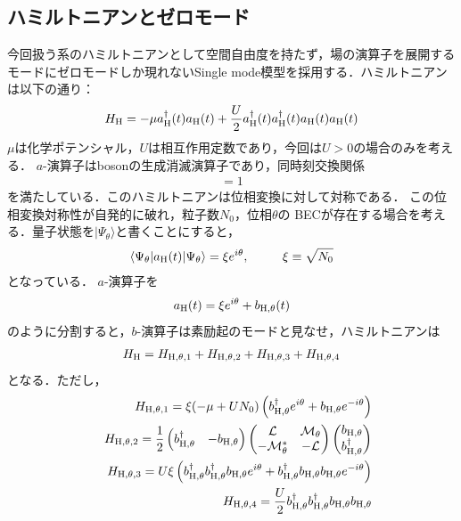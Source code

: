 \documentclass[10.5pt,a4paper]{jreport}
\begin{document}
\subsection{ハミルトニアンとゼロモード}
今回扱う系のハミルトニアンとして空間自由度を持たず，場の演算子を展開するモードにゼロモードしか現れないSingle mode模型を採用する．ハミルトニアンは以下の通り：
\begin{eqnarray}
  H_{\rm{H}} = -\mu a^{\dagger}_{\rm{H}}(t) a_{\rm{H}}(t) +\frac{U}{2} a^{\dagger}_{\rm{H}}(t) a^{\dagger}_{\rm{H}}(t) a_{\rm{H}}(t) a_{\rm{H}}(t)
\end{eqnarray}
$\mu$は化学ポテンシャル，$U$は相互作用定数であり，今回は$U>0$の場合のみを考える．
$a$-演算子はbosonの生成消滅演算子であり，同時刻交換関係
\begin{eqnarray}
  [a_{\rm{H}}(t),a^\dagger_{\rm{H}}(t)] = 1
\end{eqnarray}
を満たしている．このハミルトニアンは位相変換に対して対称である． この位相変換対称性が自発的に破れ，粒子数$N_0$，位相$\theta$の
BECが存在する場合を考える．量子状態を$|\Psi_\theta\rangle$と書くことにすると，
\begin{eqnarray}
  \langle\Psi_\theta|a_{\rm{H}}(t)|\Psi_\theta\rangle = \xi e^{i\theta},\ \ \ \ \ \ \ \  \xi \equiv \sqrt{N_0}\label{3.3}
\end{eqnarray}
となっている． $a$-演算子を
\begin{eqnarray}
  a_{\rm{H}}(t) = \xi e^{i\theta} + b_{\rm{H},\theta}(t)
\end{eqnarray}
のように分割すると，$b$-演算子は素励起のモードと見なせ，ハミルトニアンは
\begin{eqnarray}
  H_{\rm{H}} = H_{\rm{H},\theta,1} + H_{\rm{H},\theta,2} + H_{\rm{H},\theta,3} + H_{\rm{H},\theta,4} 
\end{eqnarray}
となる．ただし，
\begin{eqnarray}
  &&H_{\rm{H},\theta,1} =\xi (-\mu + UN_0)\left(b^\dagger_{\rm{H},\theta} e^{i\theta}+b_{\rm{H},\theta} e^{-i\theta}\right)\\
  &&H_{\rm{H},\theta,2} = \frac{1}{2}
  \begin{pmatrix}
    b^\dagger_{\rm{H},\theta} & -b_{\rm{H},\theta} \\
  \end{pmatrix}
  \begin{pmatrix}
    {\cal L} & {\cal M_\theta}  \\
    {\cal -M^*_\theta} & {\cal -L} 
  \end{pmatrix}
  \begin{pmatrix}
    b_{\rm{H},\theta} \\
    b^\dagger_{\rm{H},\theta}
  \end{pmatrix}
  \\
  &&H_{\rm{H},\theta,3} = U\xi\left(b^\dagger_{\rm{H},\theta}b^\dagger_{\rm{H},\theta}b_{\rm{H},\theta}e^{i\theta} + b^\dagger_{\rm{H},\theta}b_{\rm{H},\theta}b_{\rm{H},\theta}e^{-i\theta}\right)\\
  &&H_{\rm{H},\theta,4} = \frac{U}{2}b^\dagger_{\rm{H},\theta}b^\dagger_{\rm{H},\theta}b_{\rm{H},\theta}b_{\rm{H},\theta}
\end{eqnarray}
\end{document}
